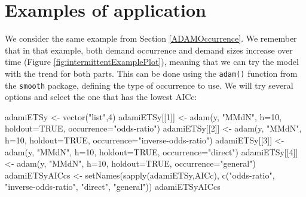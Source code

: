 \documentclass[
]{book}
\newenvironment{Shaded}{\begin{snugshade}}{\end{snugshade}}
\newcommand{\AttributeTok}[1]{\textcolor[rgb]{0.77,0.63,0.00}{#1}}
\newcommand{\ConstantTok}[1]{\textcolor[rgb]{0.00,0.00,0.00}{#1}}
\newcommand{\DecValTok}[1]{\textcolor[rgb]{0.00,0.00,0.81}{#1}}
\newcommand{\FunctionTok}[1]{\textcolor[rgb]{0.00,0.00,0.00}{#1}}
\newcommand{\NormalTok}[1]{#1}
\newcommand{\OtherTok}[1]{\textcolor[rgb]{0.56,0.35,0.01}{#1}}
\newcommand{\StringTok}[1]{\textcolor[rgb]{0.31,0.60,0.02}{#1}}
\theoremstyle{definition}
\theoremstyle{definition}
\theoremstyle{definition}
\theoremstyle{definition}
\theoremstyle{remark}
\begin{document}
\hypertarget{IntermittentExample}{%
\section{Examples of application}\label{IntermittentExample}}

We consider the same example from Section \ref{ADAMOccurrence}. We remember that in that example, both demand occurrence and demand sizes increase over time (Figure \ref{fig:intermittentExamplePlot}), meaning that we can try the model with the trend for both parts. This can be done using the \texttt{adam()} function from the \texttt{smooth} package, defining the type of occurrence to use. We will try several options and select the one that has the lowest AICc:

\begin{Shaded}
\begin{Highlighting}[]
\NormalTok{adamiETSy }\OtherTok{\textless{}{-}} \FunctionTok{vector}\NormalTok{(}\StringTok{"list"}\NormalTok{,}\DecValTok{4}\NormalTok{)}
\NormalTok{adamiETSy[[}\DecValTok{1}\NormalTok{]] }\OtherTok{\textless{}{-}} \FunctionTok{adam}\NormalTok{(y, }\StringTok{"MMdN"}\NormalTok{, }\AttributeTok{h=}\DecValTok{10}\NormalTok{, }\AttributeTok{holdout=}\ConstantTok{TRUE}\NormalTok{,}
                       \AttributeTok{occurrence=}\StringTok{"odds{-}ratio"}\NormalTok{)}
\NormalTok{adamiETSy[[}\DecValTok{2}\NormalTok{]] }\OtherTok{\textless{}{-}} \FunctionTok{adam}\NormalTok{(y, }\StringTok{"MMdN"}\NormalTok{, }\AttributeTok{h=}\DecValTok{10}\NormalTok{, }\AttributeTok{holdout=}\ConstantTok{TRUE}\NormalTok{,}
                       \AttributeTok{occurrence=}\StringTok{"inverse{-}odds{-}ratio"}\NormalTok{)}
\NormalTok{adamiETSy[[}\DecValTok{3}\NormalTok{]] }\OtherTok{\textless{}{-}} \FunctionTok{adam}\NormalTok{(y, }\StringTok{"MMdN"}\NormalTok{, }\AttributeTok{h=}\DecValTok{10}\NormalTok{, }\AttributeTok{holdout=}\ConstantTok{TRUE}\NormalTok{,}
                       \AttributeTok{occurrence=}\StringTok{"direct"}\NormalTok{)}
\NormalTok{adamiETSy[[}\DecValTok{4}\NormalTok{]] }\OtherTok{\textless{}{-}} \FunctionTok{adam}\NormalTok{(y, }\StringTok{"MMdN"}\NormalTok{, }\AttributeTok{h=}\DecValTok{10}\NormalTok{, }\AttributeTok{holdout=}\ConstantTok{TRUE}\NormalTok{,}
                       \AttributeTok{occurrence=}\StringTok{"general"}\NormalTok{)}
\NormalTok{adamiETSyAICcs }\OtherTok{\textless{}{-}}
    \FunctionTok{setNames}\NormalTok{(}\FunctionTok{sapply}\NormalTok{(adamiETSy,AICc),}
             \FunctionTok{c}\NormalTok{(}\StringTok{"odds{-}ratio"}\NormalTok{, }\StringTok{"inverse{-}odds{-}ratio"}\NormalTok{,}
               \StringTok{"direct"}\NormalTok{, }\StringTok{"general"}\NormalTok{))}
\NormalTok{adamiETSyAICcs}
\end{Highlighting}
\end{Shaded}
\end{document}
